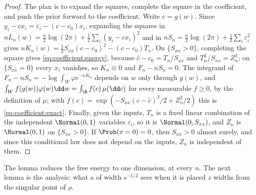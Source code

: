 \begin{refsection}

\begin{proof}
The plan is to expand the squares, complete the square in the coefficient, and push the prior forward to the coefficient. Write $c=g(w)$. Since $y_i-cx_i=\varepsilon_i-(c-c_0)x_i$, expanding the squares in $nL_n(w)=\frac n2\log(2\pi)+\frac12\sum_i(y_i-cx_i)^2$ and in $nS_n=\frac n2\log(2\pi)+\frac12\sum_i\varepsilon_i^2$ gives $nK_n(w)=\frac12S_{xx}(c-c_0)^2-(c-c_0)T_n$. On $\{S_{xx}>0\}$, completing the square gives \eqref{eq:coefficient:energy}, because $\hat c-c_0=T_n/S_{xx}$ and $T_n^2/S_{xx}=Z_n^2$; on $\{S_{xx}=0\}$ every $x_i$ vanishes, so $K_n\equiv0$ and $F_n-nS_n=0$. The integrand of $F_n-nS_n=-\log\int_W\varphi e^{-nK_n}$ depends on $w$ only through $g(w)$, and $\int_Wf(g(w))\varphi(w)\dd w=\int_\R f(c)\,\mu(\dd c)$ for every measurable $f\ge0$, by the definition of $\mu$; with $f(c)=\exp(-S_{xx}(c-\hat c)^2/2+Z_n^2/2)$ this is \eqref{eq:coefficient:exact}. Finally, given the inputs, $T_n$ is a fixed linear combination of the independent $\Normal(0,1)$ variables $\varepsilon_i$, so it is $\Normal(0,S_{xx})$, and $Z_n$ is $\Normal(0,1)$ on $\{S_{xx}>0\}$. If $\Prob(x=0)=0$, then $S_{xx}>0$ almost surely, and since this conditional law does not depend on the inputs, $Z_n$ is independent of them.
\end{proof}

The lemma reduces the free energy to one dimension, at every $n$. The next lemma is the analysis: what a  of width $s^{-1/2}$ sees when it is placed $z$ widths from the singular point of $\rho$.


\end{refsection}
